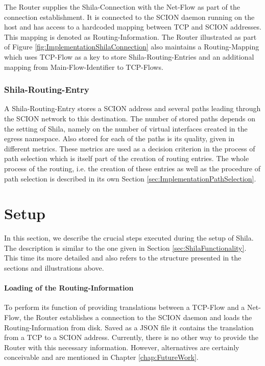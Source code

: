 The Router supplies the Shila-Connection with the Net-Flow as part of the connection establishment. It is connected to the SCION daemon running on the host and has access to a hardcoded mapping between TCP and SCION addresses. This mapping is denoted as Routing-Information. The Router illustrated as part of Figure \ref{fig:ImplementationShilaConnection} also maintains a Routing-Mapping which uses TCP-Flow as a key to store Shila-Routing-Entries and an additional mapping from Main-Flow-Identifier to TCP-Flows.

\subsubsection{Shila-Routing-Entry}

A Shila-Routing-Entry stores a SCION address and several paths leading through the SCION network to this destination. The number of stored paths depends on the setting of Shila, namely on the number of virtual interfaces created in the egress namespace. Also stored for each of the paths is its quality, given in different metrics. These metrics are used as a decision criterion in the process of path selection which is itself part of the creation of routing entries. The whole process of the routing, i.e. the creation of these entries as well as the procedure of path selection is described in its own Section \ref{sec:ImplementationPathSelection}.

\section{Setup}
\label{sec:ImplementationSetup}

In this section, we describe the crucial steps executed during the setup of Shila. The description is similar to the one given in Section \ref{sec:ShilaFunctionality}. This time its more detailed and also refers to the structure presented in the sections and illustrations above.

\paragraph{Loading of the Routing-Information}

To perform its function of providing translations between a TCP-Flow and a Net-Flow, the Router establishes a connection to the SCION daemon and loads the Routing-Information from disk. Saved as a JSON file it contains the translation from a TCP to a SCION address. Currently, there is no other way to provide the Router with this necessary information. However, alternatives are certainly conceivable and are mentioned in Chapter \ref{chap:FutureWork}.

